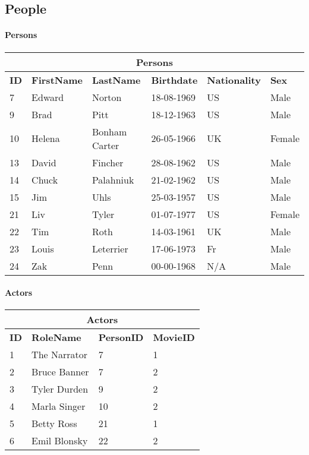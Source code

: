 \subsection{People}

\paragraph{Persons}
\begin{center}
\begin{tabular}{|l|l|l|l|l|l|}
\hline
\multicolumn{6}{|c|}{Persons} \\ \hline \hline
\textbf{ID} & \textbf{FirstName} & \textbf{LastName} & \textbf{Birthdate} & \textbf{Nationality} & \textbf{Sex} \\ \hline \hline
7 & Edward & Norton & 18-08-1969 & US & Male \\ \hline
9 & Brad & Pitt & 18-12-1963 & US & Male \\ \hline
10 & Helena & Bonham Carter & 26-05-1966 & UK & Female \\ \hline
13 & David & Fincher & 28-08-1962 & US & Male \\ \hline
14 & Chuck & Palahniuk & 21-02-1962 & US & Male \\ \hline
15 & Jim & Uhls & 25-03-1957 & US & Male \\ \hline
21 & Liv & Tyler & 01-07-1977 & US & Female \\ \hline
22 & Tim & Roth & 14-03-1961 & UK & Male \\ \hline
23 & Louis & Leterrier & 17-06-1973 & Fr & Male \\ \hline
24 & Zak & Penn & 00-00-1968 & N/A & Male \\ \hline
\end{tabular}
\end{center}

\paragraph{Actors}
\begin{center}
\begin{tabular}{|l|l|l|l|}
\hline
\multicolumn{4}{|c|}{Actors} \\ \hline \hline
\textbf{ID} & \textbf{RoleName} & \textbf{PersonID} & \textbf{MovieID} \\ \hline \hline
1 & The Narrator & 7 & 1 \\ \hline
2 & Bruce Banner & 7 & 2 \\ \hline
3 & Tyler Durden & 9 & 2 \\ \hline
4 & Marla Singer & 10 & 2 \\ \hline
5 & Betty Ross & 21 & 1 \\ \hline
6 & Emil Blonsky & 22 & 2 \\\hline 
\end{tabular}
\end{center}

